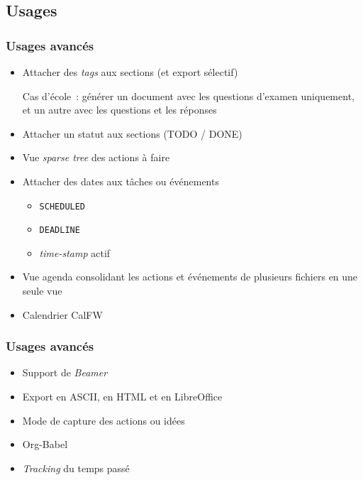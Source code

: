 \documentclass[presentation,t,hideothersubsections]{beamer}
\begin{document}
\subsection{Usages}
\label{sec-5-1}
\begin{frame}
\frametitle{Usages avancés}
\label{sec-5-1-1}


\begin{itemize}
\item Attacher des \emph{tags} aux sections (et export sélectif)

  Cas d'école : générer un document avec les questions d'examen uniquement, et
  un autre avec les questions et les réponses
\item Attacher un statut aux sections (TODO / DONE)
\item Vue \emph{sparse tree} des actions à faire
\item Attacher des dates aux tâches ou événements
\begin{itemize}
\item \texttt{SCHEDULED}
\item \texttt{DEADLINE}
\item \emph{time-stamp} actif
\end{itemize}
\item Vue agenda consolidant les actions et événements de plusieurs fichiers en
  une seule vue
\item Calendrier CalFW
\end{itemize}
\end{frame}
\begin{frame}
\frametitle{Usages avancés}
\label{sec-5-1-2}


\begin{itemize}
\item Support de \emph{Beamer}
\item Export en ASCII, en HTML et en LibreOffice
\item Mode de capture des actions ou idées
\item Org-Babel
\item \emph{Tracking} du temps passé
\end{itemize}
\end{frame}
\end{document}

